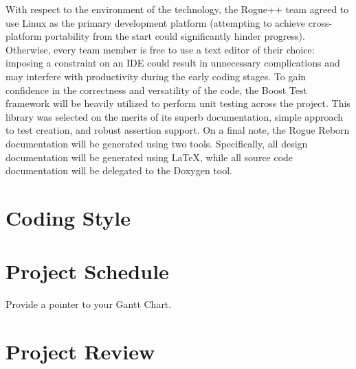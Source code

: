 \documentclass{article}
\begin{document}
With respect to the environment of the technology, the Rogue++ team agreed to use Linux as the primary development platform (attempting to achieve cross-platform portability from the start could significantly hinder progress).  Otherwise, every team member is free to use a text editor of their choice: imposing a constraint on an IDE could result in unnecessary complications and may interfere with productivity during the early coding stages.  To gain confidence in the correctness and versatility of the code, the Boost Test framework will be heavily utilized to perform unit testing across the project.  This library was selected on the merits of its superb documentation, simple approach to test creation, and robust assertion support.  On a final note, the Rogue Reborn documentation will be generated using two tools.  Specifically, all design documentation will be generated using LaTeX, while all source code documentation will be delegated to the Doxygen tool.

\section{Coding Style}

\section{Project Schedule}

Provide a pointer to your Gantt Chart.

\section{Project Review}
\end{document}
